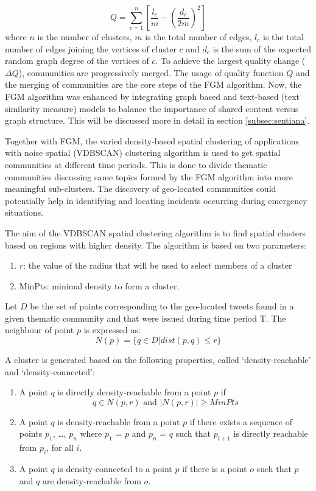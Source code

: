 \begin{equation}
	Q = \sum_{c = 1}^{n} \left [ \frac{l_c}{m} - \left (\frac{d_c}{2m} \right )^2 \right ]
\end{equation}where $n$ is the number of clusters, $m$ is the total number of edges, $l_c$ is the total number of edges joining the vertices of cluster $c$ and $d_c$ is the sum of the expected random graph degree of the vertices of $c$. To achieve the largest quality change ($\Delta$$Q$), communities are progressively merged. The usage of quality function $Q$ and the merging of communities are the core steps of the FGM algorithm. Now, the FGM algorithm was enhanced by integrating graph based and text-based (text similarity measure) models to balance the importance of shared content versus graph structure. This will be discussed more in detail in section \ref{subsec:sentiana}.


Together with FGM, the varied density-based spatial clustering of applications with noise spatial (VDBSCAN) clustering algorithm is used to get spatial communities at different time periods. This is done to divide thematic communities discussing same topics formed by the FGM algorithm into more meaningful sub-clusters. The discovery of geo-located communities could potentially help in identifying and locating incidents occurring during emergency situations.


The aim of the VDBSCAN spatial clustering algorithm is to find spatial clusters based on regions with higher density. The algorithm is based on two parameters:
\begin{enumerate}
	\item $r$: the value of the radius that will be used to select members of a cluster
	\item MinPts: minimal density to form a cluster.
\end{enumerate}
Let $D$ be the set of points corresponding to the geo-located tweets found in a given thematic community and that were issued during time period T. The neighbour of point $p$ is expressed as:
\begin{equation}
	N(p) = \{ q \in D|dist(p,q) \le r \}
\end{equation}


A cluster is generated based on the following properties, called ‘density-reachable’ and ‘density-connected’:
\begin{enumerate}
	\item A point $q$ is directly density-reachable from a point $p$ if
	\begin{equation}
		q \in N(p,r) \text{ and } |N(p,r)| \ge MinPts
	\end{equation}
	
	\item A point $q$ is density-reachable from a point $p$ if there exists a sequence of points $p_1$, …, $p_n$ where $p_1$ = $p$ and $p_n$ = $q$ such that $p_{i+1}$ is directly reachable from $p_i$, for all $i$.
	\item A point $q$ is density-connected to a point $p$ if there is a point $o$ such that $p$ and $q$ are density-reachable from $o$.
\end{enumerate}


